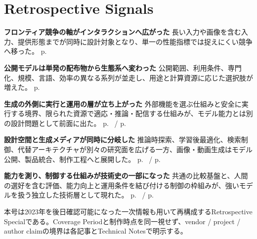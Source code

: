 \section*{Retrospective Signals}
\smallskip
\noindent\textbf{フロンティア競争の軸がインタラクションへ広がった} 長い入力や画像を含む入力、提供形態までが同時に設計対象となり、単一の性能指標では捉えにくい競争へ移った。 \hfill{\footnotesize p.~\pageref{pkg:frontier-interface}}\par
\smallskip
\noindent\textbf{公開モデルは単発の配布物から生態系へ変わった} 公開範囲、利用条件、専門化、規模、言語、効率の異なる系列が並走し、用途と計算資源に応じた選択肢が増えた。 \hfill{\footnotesize p.~\pageref{pkg:open-weight-ecosystem}}\par
\smallskip
\noindent\textbf{生成の外側に実行と運用の層が立ち上がった} 外部機能を選ぶ仕組みと安全に実行する境界、限られた資源で適応・推論・配信する仕組みが、モデル能力とは別の設計問題として前面に出た。 \hfill{\footnotesize p.~\pageref{pkg:tool-action-layer} / p.~\pageref{pkg:runtime-adaptation}}\par
\smallskip
\noindent\textbf{設計空間と生成メディアが同時に分岐した} 推論時探索、学習後最適化、検索制御、代替アーキテクチャが別々の研究面を広げる一方、画像・動画生成はモデル公開、製品統合、制作工程へと展開した。 \hfill{\footnotesize p.~\pageref{pkg:reasoning-retrieval-architecture} / p.~\pageref{pkg:generative-media}}\par
\smallskip
\noindent\textbf{能力を測り、制御する仕組みが技術史の一部になった} 共通の比較基盤と、人間の選好を含む評価、能力向上と運用条件を結び付ける制御の枠組みが、強いモデルを扱う独立した技術層として現れた。 \hfill{\footnotesize p.~\pageref{pkg:evaluation-control} / p.~\pageref{pkg:annual-synthesis}}\par
\medskip
\begin{claimboundary}
本号は2023年を後日確認可能になった一次情報も用いて再構成するRetrospective Specialである。Coverage Periodと制作時点を同一視せず、vendor / project / author claimの境界は各記事とTechnical Notesで明示する。
\end{claimboundary}
\medskip
\tableofcontents

